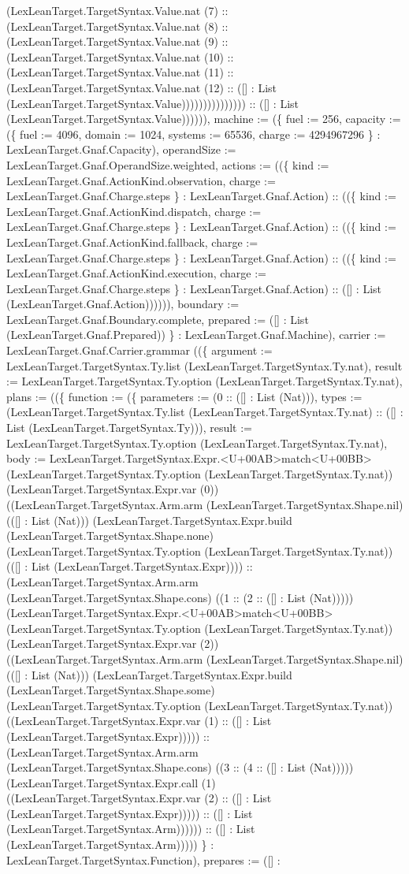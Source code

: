 \documentclass[11pt]{article}
\begin{document}
(LexLeanTarget.TargetSyntax.Value.nat (7) :: (LexLeanTarget.TargetSyntax.Value.nat (8) :: (LexLeanTarget.TargetSyntax.Value.nat (9) :: (LexLeanTarget.TargetSyntax.Value.nat (10) :: (LexLeanTarget.TargetSyntax.Value.nat (11) :: (LexLeanTarget.TargetSyntax.Value.nat (12) :: ([] : List (LexLeanTarget.TargetSyntax.Value))))))))))))))) :: ([] : List (LexLeanTarget.TargetSyntax.Value)))))), machine := (\{ fuel := 256, capacity := (\{ fuel := 4096, domain := 1024, systems := 65536, charge := 4294967296 \} : LexLeanTarget.Gnaf.Capacity), operandSize := LexLeanTarget.Gnaf.OperandSize.weighted, actions := ((\{ kind := LexLeanTarget.Gnaf.ActionKind.observation, charge := LexLeanTarget.Gnaf.Charge.steps \} : LexLeanTarget.Gnaf.Action) :: ((\{ kind := LexLeanTarget.Gnaf.ActionKind.dispatch, charge := LexLeanTarget.Gnaf.Charge.steps \} : LexLeanTarget.Gnaf.Action) :: ((\{ kind := LexLeanTarget.Gnaf.ActionKind.fallback, charge := LexLeanTarget.Gnaf.Charge.steps \} : LexLeanTarget.Gnaf.Action) :: ((\{ kind := LexLeanTarget.Gnaf.ActionKind.execution, charge := LexLeanTarget.Gnaf.Charge.steps \} : LexLeanTarget.Gnaf.Action) :: ([] : List (LexLeanTarget.Gnaf.Action)))))), boundary := LexLeanTarget.Gnaf.Boundary.complete, prepared := ([] : List (LexLeanTarget.Gnaf.Prepared)) \} : LexLeanTarget.Gnaf.Machine), carrier := LexLeanTarget.Gnaf.Carrier.grammar ((\{ argument := LexLeanTarget.TargetSyntax.Ty.list (LexLeanTarget.TargetSyntax.Ty.nat), result := LexLeanTarget.TargetSyntax.Ty.option (LexLeanTarget.TargetSyntax.Ty.nat), plans := ((\{ function := (\{ parameters := (0 :: ([] : List (Nat))), types := (LexLeanTarget.TargetSyntax.Ty.list (LexLeanTarget.TargetSyntax.Ty.nat) :: ([] : List (LexLeanTarget.TargetSyntax.Ty))), result := LexLeanTarget.TargetSyntax.Ty.option (LexLeanTarget.TargetSyntax.Ty.nat), body := LexLeanTarget.TargetSyntax.Expr.<U+00AB>match<U+00BB> (LexLeanTarget.TargetSyntax.Ty.option (LexLeanTarget.TargetSyntax.Ty.nat)) (LexLeanTarget.TargetSyntax.Expr.var (0)) ((LexLeanTarget.TargetSyntax.Arm.arm (LexLeanTarget.TargetSyntax.Shape.nil) (([] : List (Nat))) (LexLeanTarget.TargetSyntax.Expr.build (LexLeanTarget.TargetSyntax.Shape.none) (LexLeanTarget.TargetSyntax.Ty.option (LexLeanTarget.TargetSyntax.Ty.nat)) (([] : List (LexLeanTarget.TargetSyntax.Expr)))) :: (LexLeanTarget.TargetSyntax.Arm.arm (LexLeanTarget.TargetSyntax.Shape.cons) ((1 :: (2 :: ([] : List (Nat))))) (LexLeanTarget.TargetSyntax.Expr.<U+00AB>match<U+00BB> (LexLeanTarget.TargetSyntax.Ty.option (LexLeanTarget.TargetSyntax.Ty.nat)) (LexLeanTarget.TargetSyntax.Expr.var (2)) ((LexLeanTarget.TargetSyntax.Arm.arm (LexLeanTarget.TargetSyntax.Shape.nil) (([] : List (Nat))) (LexLeanTarget.TargetSyntax.Expr.build (LexLeanTarget.TargetSyntax.Shape.some) (LexLeanTarget.TargetSyntax.Ty.option (LexLeanTarget.TargetSyntax.Ty.nat)) ((LexLeanTarget.TargetSyntax.Expr.var (1) :: ([] : List (LexLeanTarget.TargetSyntax.Expr))))) :: (LexLeanTarget.TargetSyntax.Arm.arm (LexLeanTarget.TargetSyntax.Shape.cons) ((3 :: (4 :: ([] : List (Nat))))) (LexLeanTarget.TargetSyntax.Expr.call (1) ((LexLeanTarget.TargetSyntax.Expr.var (2) :: ([] : List (LexLeanTarget.TargetSyntax.Expr))))) :: ([] : List (LexLeanTarget.TargetSyntax.Arm)))))) :: ([] : List (LexLeanTarget.TargetSyntax.Arm))))) \} : LexLeanTarget.TargetSyntax.Function), prepares := ([] : 
\end{document}
